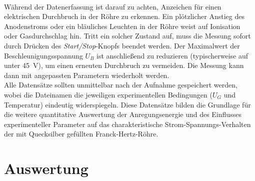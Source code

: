 \vspace{0.3cm}\\
Während der Datenerfassung ist darauf zu achten, Anzeichen für einen elektrischen Durchbruch in der Röhre zu erkennen. Ein plötzlicher Anstieg des Anodenstroms oder ein bläuliches Leuchten in der Röhre weist auf Ionisation oder Gasdurchschlag hin. Tritt ein solcher Zustand auf, muss die Messung sofort durch Drücken des \textit{Start/Stop}-Knopfs beendet werden. Der Maximalwert der Beschleunigungsspannung $U_B$ ist anschließend zu reduzieren (typischerweise auf unter \SI{45}{\volt}), um einen erneuten Durchbruch zu vermeiden. Die Messung kann dann mit angepassten Parametern wiederholt werden.
\vspace{0.3cm}\\
Alle Datensätze sollten unmittelbar nach der Aufnahme gespeichert werden, wobei die Dateinamen die jeweiligen experimentellen Bedingungen ($U_G$ und Temperatur) eindeutig widerspiegeln. Diese Datensätze bilden die Grundlage für die weitere quantitative Auswertung der Anregungsenergie und des Einflusses experimenteller Parameter auf das charakteristische Strom-Spannungs-Verhalten der mit Quecksilber gefüllten Franck-Hertz-Röhre.
\section{Auswertung}
